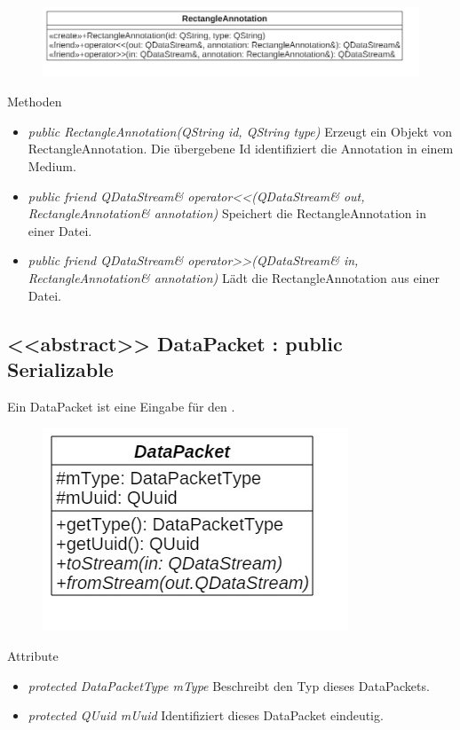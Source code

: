 \begin{figure}[H]
\centering
\includegraphics[scale=0.5]{img/Klassendiagramm/Klassen/Model/RectangleAnnotation}
\label{fig:rectangleAnnotation}
\end{figure}

Methoden
\begin{itemize}
\item \textit{public RectangleAnnotation(QString id, QString type)} Erzeugt ein Objekt von RectangleAnnotation. Die übergebene Id identifiziert die \gls{Annotation} in einem Medium.
\item \textit{public friend QDataStream\& operator<<(QDataStream\& out, RectangleAnnotation\& annotation)} Speichert die RectangleAnnotation in einer Datei.
\item \textit{public friend QDataStream\& operator>>(QDataStream\& in, RectangleAnnotation\& annotation)} Lädt die RectangleAnnotation aus einer Datei.
\end{itemize}

\subsection*{<<abstract>> DataPacket : public Serializable}
Ein DataPacket ist eine Eingabe für den .

\begin{figure}[H]
\centering
\includegraphics[scale=0.5]{img/Klassendiagramm/Klassen/Model/DataPacket}
\label{fig:dataPacket}
\end{figure}

Attribute
\begin{itemize}
\item\textit{protected DataPacketType mType} Beschreibt den Typ dieses DataPackets.
\item\textit{protected QUuid mUuid} Identifiziert dieses DataPacket eindeutig. 
\end{itemize}

